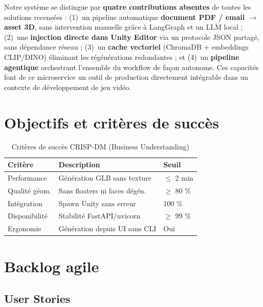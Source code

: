 \documentclass[12pt,a4paper,oneside]{report}
\newcommand{\theadrow}{\rowcolor{tekupblue!12}}
\begin{document}
Notre système se distingue par \textbf{quatre contributions absentes} de toutes
les solutions recensées : (1)~un pipeline automatique \textbf{document PDF /
email $\rightarrow$ asset 3D}, sans intervention manuelle grâce à LangGraph et
un LLM local ; (2)~une \textbf{injection directe dans Unity Editor} via un
protocole JSON partagé, sans dépendance réseau ; (3)~un \textbf{cache vectoriel}
(ChromaDB + embeddings CLIP/DINO) éliminant les régénérations redondantes ;
et (4)~un \textbf{pipeline agentique} orchestrant l'ensemble du workflow de
façon autonome. Ces capacités font de ce microservice un outil de production
directement intégrable dans un contexte de développement de jeu vidéo.

\section{Objectifs et critères de succès}

\begin{table}[H]
\centering
\caption{Critères de succès CRISP-DM (Business Understanding)}
\label{tab:success}
\begin{tabularx}{\linewidth}{@{}lXl@{}}
\toprule
\theadrow
\textbf{Critère} & \textbf{Description} & \textbf{Seuil} \\\midrule
Performance    & Génération GLB sans texture  & $\leq$ 2 min \\
Qualité géom.  & Sans floaters ni faces dégén.& $\geq$ 80 \% \\
Intégration    & Spawn Unity sans erreur      & 100 \% \\
Disponibilité  & Stabilité FastAPI/uvicorn     & $\geq$ 99 \% \\
Ergonomie      & Génération depuis UI sans CLI& Oui \\
\bottomrule
\end{tabularx}
\end{table}

\section{Backlog agile}

\subsection{User Stories}
\end{document}
